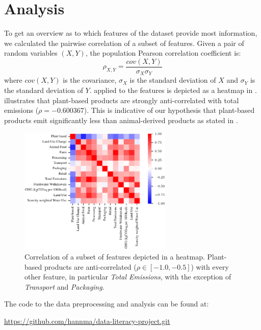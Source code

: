 \documentclass{article}
\begin{document}
\section{Analysis}
\label{analysis}

To get an overview as to which features of the dataset provide most information, we calculated the pairwise correlation of a subset of features. Given a pair of random variables $(X,Y)$, the population Pearson correlation coefficient is: 
\begin{equation} \label{eq:corr}
  \rho_{X,Y} = \frac{cov(X,Y)}{\sigma_X \sigma_Y}
\end{equation}
where $cov(X,Y)$ is the covariance, $\sigma_X$ is the standard deviation of $X$ and $\sigma_Y$ is the standard deviation of $Y$.
 applied to the features is depicted  as a heatmap in  .   illustrates that
plant-based products are strongly anti-correlated with total emissions ($\rho =  -0.600367$). %
 This is indicative of our hypothesis that plant-based products emit significantly less than animal-derived products as stated in  .


\begin{figure}[h]
  \centering
  \includegraphics[width=0.65\textwidth]{figures/heat-map.pdf}
  \caption{Correlation of a subset of features depicted in a heatmap. Plant-based products are  anti-correlated ($\rho \in [-1.0, -0.5]$) with every other feature, in particular \textit{Total Emissions}, with the  exception of \textit{Transport} and \textit{Packaging}.}
  \label{fig:corr}
\end{figure}
The code to the data preprocessing and analysis can be found at: \par
\centerline{\url{https://github.com/hannma/data-literacy-project.git}}
\end{document}

